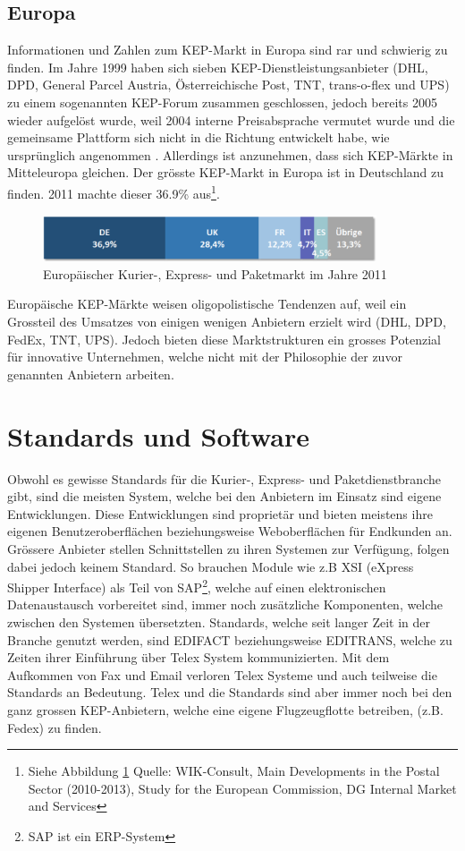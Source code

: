 \subsection{Europa}
Informationen und Zahlen zum KEP-Markt in Europa sind rar und schwierig zu finden. Im Jahre 1999 haben sich sieben KEP-Dienstleistungsanbieter (DHL, DPD, General Parcel Austria, Österreichische Post,
TNT, trans-o-flex und UPS) zu einem sogenannten KEP-Forum zusammen geschlossen, jedoch bereits 2005 wieder aufgelöst wurde, weil 2004 interne Preisabsprache vermutet wurde und die gemeinsame Plattform sich nicht in die Richtung entwickelt habe, wie ursprünglich angenommen \citep[S. 14]{mencler2006KEP}. Allerdings ist anzunehmen, dass sich KEP-Märkte in Mitteleuropa gleichen. Der grösste KEP-Markt in Europa ist in Deutschland zu finden. 2011 machte dieser  36.9\% aus\footnote{Siehe Abbildung \ref{fig1:marktanteil} Quelle: WIK-Consult, Main Developments in the Postal Sector (2010-2013), Study for the European Commission, DG Internal Market and Services}.
\begin{figure}[ht]
	\centering
  \includegraphics[width=0.88\textwidth]{images/kepMarktEuropa2011.png}
	\caption{Europäischer Kurier-, Express- und Paketmarkt im Jahre 2011} %
	\label{fig1:marktanteil}
\end{figure}
Europäische KEP-Märkte weisen oligopolistische Tendenzen auf, weil ein Grossteil des Umsatzes von einigen wenigen Anbietern erzielt wird (DHL, DPD, FedEx, TNT, UPS)\citep[S.14]{baum2004produktivitats}. Jedoch bieten diese Marktstrukturen ein grosses Potenzial für innovative Unternehmen, welche nicht mit der Philosophie der zuvor genannten Anbietern arbeiten.


\section{Standards und Software}
Obwohl es gewisse Standards für die Kurier-, Express- und Paketdienstbranche gibt, sind die meisten System, welche bei den Anbietern im Einsatz sind eigene Entwicklungen. Diese Entwicklungen sind proprietär und bieten meistens ihre eigenen Benutzeroberflächen beziehungsweise Weboberflächen für Endkunden an. Grössere Anbieter stellen Schnittstellen zu ihren Systemen zur Verfügung, folgen dabei jedoch keinem Standard. So brauchen Module wie z.B XSI (eXpress Shipper Interface) als Teil von SAP\footnote{SAP ist ein ERP-System}, welche auf einen elektronischen Datenaustausch vorbereitet sind, immer noch zusätzliche Komponenten, welche zwischen den Systemen übersetzten.
\newline{}
Standards, welche seit langer Zeit in der Branche genutzt werden, sind EDIFACT beziehungsweise EDITRANS, welche zu Zeiten ihrer Einführung über Telex System kommunizierten. Mit dem Aufkommen von Fax und Email verloren Telex Systeme und auch teilweise die Standards an Bedeutung. Telex und die Standards sind aber immer noch bei den ganz grossen KEP-Anbietern, welche eine eigene Flugzeugflotte betreiben, (z.B. Fedex) zu finden.

